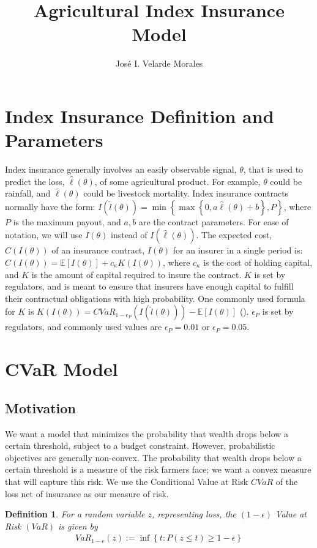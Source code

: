 \documentclass[11pt]{article}
\title{Agricultural Index Insurance Model}
\author{José I. Velarde Morales}
\newtheorem{defn}[lemma]{Definition}
\begin{document}
\maketitle

\section{Index Insurance Definition and Parameters}
    Index insurance generally involves an easily observable signal, $\theta$, that is used to predict the loss, $\hat{\ell}(\theta)$, of some agricultural product. For example, $\theta$ could be rainfall, and $\hat{\ell}(\theta)$ could be livestock mortality. Index insurance contracts normally have the form: $I(\hat{l}(\theta)) = \min \left \{\max \left \{0,a\hat{\ell}(\theta) + b \right \}, P \right \}$, where $P$ is the maximum payout, and $a,b$ are the contract parameters. For ease of notation, we will use $I(\theta)$ instead of $I(\hat{\ell}(\theta))$. The expected cost, $C(I(\theta))$ of an insurance contract, $I(\theta)$ for an insurer in a single period is: $C(I(\theta)) = \mathbb{E}[I(\theta)] + c_{\kappa} K(I(\theta))$, where $c_{\kappa}$ is the cost of holding capital, and $K$ is the amount of capital required to insure the contract. $K$ is set by regulators, and is meant to ensure that insurers have enough capital to fulfill their contractual obligations with high probability. One commonly used formula for $K$ is $K(I(\theta)) = CVaR_{1-\epsilon_P}\left ( I(\hat{l}(\theta)) \right ) - \mathbb{E}[I(\theta)]$ (\cite{mapfumo2017risk}). $\epsilon_P$ is set by regulators, and commonly used values are $\epsilon_P = 0.01$ or $\epsilon_P = 0.05$. 

\section{CVaR Model}
  \subsection{Motivation}
    We want a model that minimizes the probability that wealth drops below a certain threshold, subject to a budget constraint. However, probabilistic objectives are generally non-convex. The probability that wealth drops below a certain threshold is a measure of the risk farmers face; we want a convex measure that will capture this risk. We use the Conditional Value at Risk $CVaR$ of the loss net of insurance as our measure of risk. 

  \begin{defn}
    For a random variable $z$, representing loss, the $(1-\epsilon)$ Value at Risk $(VaR)$ is given by 
    \begin{align*}
      VaR_{1-\epsilon}(z) := \inf \left \{ t : P(z \leq t) \geq 1-\epsilon \right \}
    \end{align*}
  \end{defn}
\end{document}
